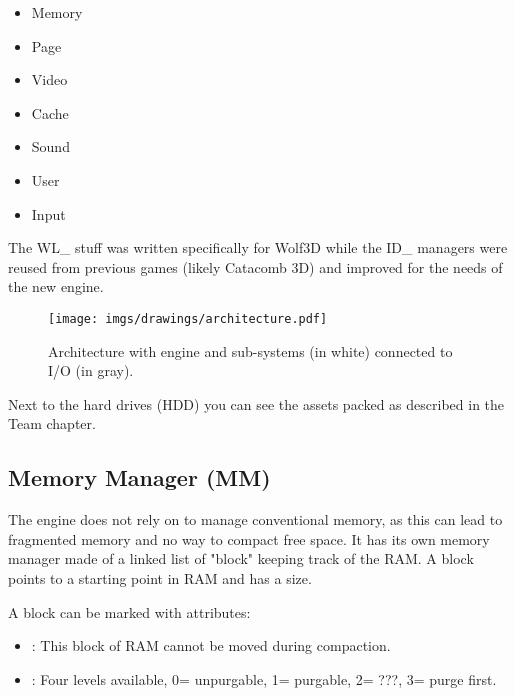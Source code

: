 \documentclass[book.tex]{subfiles}
\begin{document}
\begin{itemize}
	\item Memory
	\item Page
	\item Video
	\item Cache
	\item Sound
	\item User
	\item Input
\end{itemize}
\par
The WL\_ stuff was written specifically for Wolf3D while the ID\_ managers were reused from previous games (likely Catacomb 3D) and improved for the needs of the new engine.

\begin{figure}[H]
\centering
\texttt{[image: imgs/drawings/architecture.pdf]}
\caption{Architecture with engine and sub-systems (in white) connected to I/O (in gray).}
\label{fig:architecture}
\end{figure}
Next to the hard drives (HDD) you can see the assets packed as described in the Team chapter.










\subsection{Memory Manager (MM)}
The engine does not rely on  to manage conventional memory, as this can lead to fragmented memory and no way to compact free space. It has its own memory manager made of a linked list of "block" keeping track of the RAM. A block points to a starting point in RAM and has a size.\\
 \par

 \par
A block can be marked with attributes:
\begin{itemize}
\item {} : This block of RAM cannot be moved during compaction.
\item {} : Four levels available, 0= unpurgable, 1= purgable, 2= ???, 3= purge first.
\end{itemize}
\end{document}
